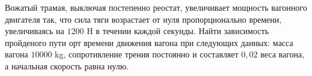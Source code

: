 Вожатый трамая, выключая постепенно реостат, увеличивает мощность
вагонного двигателя так, что сила тяги возрастает от нуля пропорционально
времени, увеличиваясь на $1200$ H в течении каждой секунды. Найти 
зависимость пройденого пути орт времени движения вагона при следующих 
данных: масса вагона $10 000 $ kg, сопротивление трения постоянно и 
составляет $0,02$ веса вагона, а начальная скорость равна нулю.
